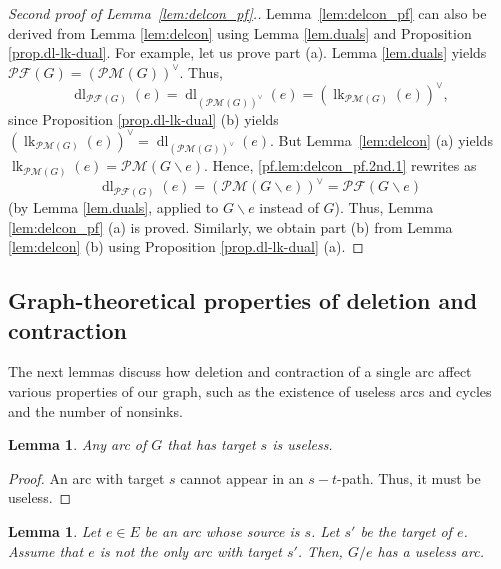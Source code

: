 \documentclass[12pt]{amsart}
\newtheorem{lemma}[theorem]{Lemma}
\theoremstyle{definition}
\DeclareMathOperator{\lk}{lk}
\DeclareMathOperator{\dl}{dl}
\newcommand{\Pm}[1]{\mathcal{PM}\left(#1\right)}
\newcommand{\Pf}[1]{\mathcal{PF}\left(#1\right)}
\begin{document}
\begin{proof}[Second proof of Lemma~\ref{lem:delcon_pf}.]
Lemma~\ref{lem:delcon_pf} can also
be derived from Lemma \ref{lem:delcon} using Lemma \ref{lem.duals}
and Proposition \ref{prop.dl-lk-dual}. For example, let us prove part (a).
Lemma \ref{lem.duals} yields $\Pf{G}  =\left(
\Pm{G}  \right)  ^{\vee}$. Thus,
\begin{equation}
\dl_{\Pf{G}  }(e) = \dl_{\left(  \Pm{G} \right)  ^{\vee}}(e)
= \left(  \lk_{\Pm{G} }\left(  e\right)  \right)  ^{\vee},
\label{pf.lem:delcon_pf.2nd.1}
\end{equation}
since Proposition \ref{prop.dl-lk-dual} (b) yields
$\left(  \lk_{\Pm{G}  }\left(  e\right)  \right)  ^{\vee}
= \dl_{\left( \Pm{G}  \right)  ^{\vee}}(e)$.
But Lemma~\ref{lem:delcon} (a) yields $\lk_{\Pm{G} }(e)
= \Pm{G\backslash e}$.
Hence, \eqref{pf.lem:delcon_pf.2nd.1} rewrites as
\[
\dl_{\Pf{G}  }(e)
= \left(  \Pm{G\backslash e} \right)  ^{\vee}
= \Pf{G\backslash e}
\]
(by Lemma \ref{lem.duals}, applied to $G\backslash e$ instead of $G$). Thus,
Lemma \ref{lem:delcon_pf} (a) is proved. Similarly, we obtain part (b) from
Lemma \ref{lem:delcon} (b) using Proposition \ref{prop.dl-lk-dual} (a).
\end{proof}

\subsection{\label{subsect.delcont.graph}Graph-theoretical properties of deletion and contraction}

The next lemmas discuss how deletion and contraction of a single arc affect various properties of our graph, such as the existence of useless arcs and cycles and the number of nonsinks.

\begin{lemma}\label{lem:tgt-s-useless}
    Any arc of $G$ that has target $s$ is useless.
\end{lemma}

\begin{proof}
An arc with target $s$ cannot appear in an $s-t$-path.
Thus, it must be useless.
\end{proof}

\begin{lemma}\label{lem:induction_step_1}
	Let $e \in E$ be an arc whose source is $s$.
    Let $s'$ be the target of $e$.
    Assume that $e$ is not the only arc with target $s'$.
    Then, $G / e$ has a useless arc.
\end{lemma}
\end{document}
